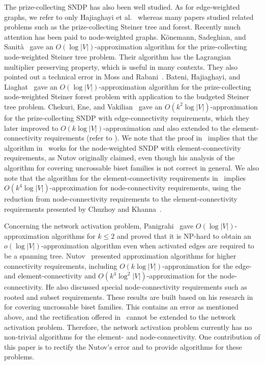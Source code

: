 \documentclass[11pt]{article}
\begin{document}
The prize-collecting SNDP has also been well studied.
As for edge-weighted graphs,
we refer to only Hajiaghayi et al.~\cite{HajiaghayiKKN12} 
whereas many papers studied related problems such as the prize-collecting Steiner tree and forest.
Recently much attention has been paid to node-weighted graphs.
K\"onemann, Sadeghian, and Sanit\`a~\cite{Konemann13CoRR} gave an $O(\log
|V|)$-approximation algorithm for the prize-collecting node-weighted Steiner tree problem.
Their algorithm has the Lagrangian multiplier preserving property, which is
useful in many contexts.
They also pointed out a technical error in Moss and Rabani~\cite{MossR07}.
Bateni, Hajiaghayi, and Liaghat~\cite{BateniHL13} gave an $O(\log
|V|)$-approximation algorithm for the prize-collecting node-weighted Steiner forest
problem with application to the budgeted Steiner tree problem.
Chekuri, Ene, and Vakilian~\cite{ChekuriEV12} gave an $O(k^2 \log
|V|)$-approximation for the prize-collecting SNDP with edge-connectivity
requirements, which they later improved to $O(k \log |V|)$-approximation
and also extended to 
the element-connectivity
requirements (refer to \cite{Vakilian13}).
We note that the proof in~\cite{Vakilian13} implies that the 
algorithm in~\cite{Nutov12uncrossable} works for the node-weighted SNDP
with element-connectivity requirements,
as Nutov originally claimed, even though his analysis of the algorithm for covering
uncrossable biset families is not correct in general.
We also note that 
the algorithm for the element-connectivity requirements in~\cite{Vakilian13} implies 
$O(k^4\log |V|)$-approximation for node-connectivity requirements,
using the reduction from node-connectivity requirements to 
the element-connectivity requirements presented by Chuzhoy and Khanna~\cite{ChuzhoyK12}.

Concerning the network activation problem, 
Panigrahi~\cite{Panigrahi11wireless} gave $O(\log |V|)$-approximation
algorithms for $k\leq 2$ and proved
that it is NP-hard to obtain an $o(\log |V|)$-approximation algorithm even
when activated edges are required to be a spanning tree.
Nutov~\cite{Nutov13activation} presented approximation algorithms for
higher connectivity requirements, including $O(k\log |V|)$-approximation for
the edge- and element-connectivity and $O(k^4 \log^2 |V|)$-approximation for
the node-connectivity.
He also discussed special node-connectivity requirements such as rooted and
subset requirements.
These results are built based on his research in~\cite{Nutov12uncrossable} for
covering uncrossable biset families. 
This contains an error as
mentioned above, and 
the rectification offered in~\cite{Vakilian13} cannot be extended to the network
activation problem.
Therefore, the network activation problem currently
has no non-trivial algorithms for the element- and node-connectivity.
One contribution of this paper is to rectify the Nutov's error and to provide
algorithms for these problems.
\end{document}
